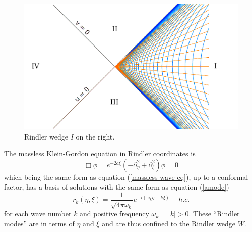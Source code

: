 \documentclass[12pt,a4paper]{article}
\begin{document}
\begin{figure}[h]
\centering
\includegraphics[scale=0.4]{rindler_w.png}
\caption{Rindler wedge $I$ on the right.}
\label{rindlerw}
\end{figure}

The massless Klein-Gordon equation in Rindler coordinates is
\begin{equation}
  \Box \phi = e^{-2a \xi}(-\partial_\eta^2 + \partial_\xi^2) \phi = 0
\end{equation}
which being the same form as equation (\ref{massless-wave-eq}), up to a conformal factor, has a basis of solutions with the same form as equation (\ref{amode})
\begin{equation}
 r_k(\eta,\xi) = \frac{1}{\sqrt{4 \pi \omega_k}} e^{-i(\omega_k \eta -k \xi)} + h.c.
\end{equation}
for each wave number $k$ and positive frequency $\omega_k = |k| > 0$.  These ``Rindler modes'' are in terms of $\eta$ and $\xi$ and are thus confined to the Rindler wedge $W$.  
\end{document}
